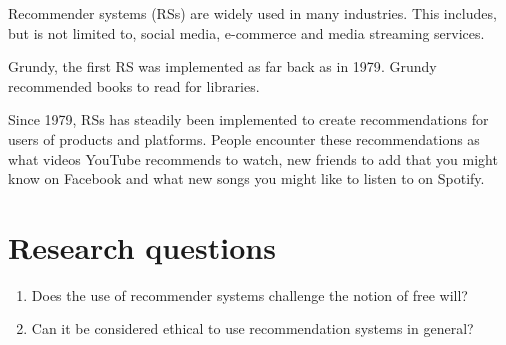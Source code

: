 
Recommender systems (RSs) are widely used in many industries. This includes, but is not limited to, social media, e-commerce and media streaming services.

Grundy, the first RS was implemented as far back as in 1979\parencite{nurul_qomariyah_definition_nodate}. Grundy recommended books to read for libraries.

Since 1979, RSs has steadily been implemented to create recommendations for users of products and platforms. People encounter these recommendations as what videos YouTube recommends to watch, new friends to add that you might know on Facebook and what new songs you might like to listen to on Spotify.

\section{Research questions}

\begin{enumerate}
    \item Does the use of recommender systems challenge the notion of free will?
    \item {}Can it be considered ethical to use recommendation systems in general?
\end{enumerate}